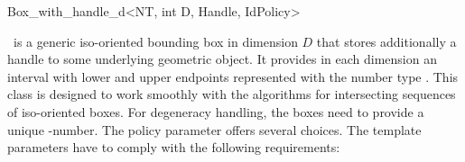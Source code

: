 

\begin{ccRefClass}{Box_with_handle_d<NT, int D, Handle, IdPolicy>}
\ccDefinition

\ccRefName\ is a generic iso-oriented bounding box in dimension $D$
that stores additionally a handle to some underlying geometric object.
It provides in each dimension an interval with lower and upper
endpoints represented with the number type .  This class is
designed to work smoothly with the algorithms for intersecting
sequences of iso-oriented boxes.  For degeneracy handling, the boxes
need to provide a unique -number. The policy parameter
 offers several choices. The template parameters have to
comply with the following requirements:


\end{ccRefClass}

